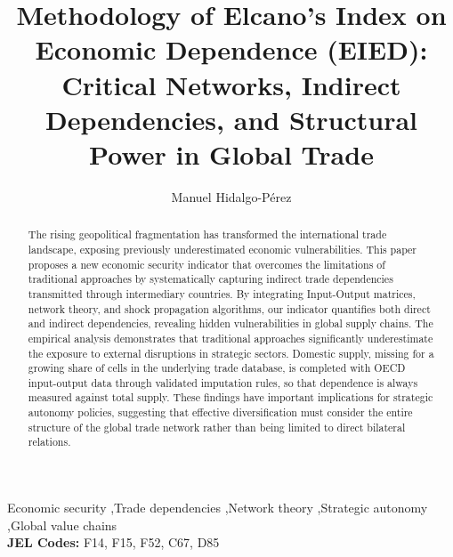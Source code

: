 \documentclass[final,1p,times,authoryear]{elsarticle}
\begin{document}
\begin{frontmatter}
\title{Methodology of Elcano's Index on Economic Dependence (EIED): Critical Networks, Indirect Dependencies, and Structural Power in Global Trade}

\author[upo,elcano]{Manuel Hidalgo-Pérez}



\begin{abstract}
The rising geopolitical fragmentation has transformed the international trade landscape, exposing previously underestimated economic vulnerabilities. This paper proposes a new economic security indicator that overcomes the limitations of traditional approaches by systematically capturing indirect trade dependencies transmitted through intermediary countries. By integrating Input-Output matrices, network theory, and shock propagation algorithms, our indicator quantifies both direct and indirect dependencies, revealing hidden vulnerabilities in global supply chains. The empirical analysis demonstrates that traditional approaches significantly underestimate the exposure to external disruptions in strategic sectors. Domestic supply, missing for a growing share of cells in the underlying trade database, is completed with OECD input-output data through validated imputation rules, so that dependence is always measured against total supply. These findings have important implications for strategic autonomy policies, suggesting that effective diversification must consider the entire structure of the global trade network rather than being limited to direct bilateral relations.
\end{abstract}

\begin{keyword}
Economic security \sep Trade dependencies \sep Network theory \sep Strategic autonomy \sep Global value chains\\
\textbf{JEL Codes:} F14, F15, F52, C67, D85
\end{keyword}
\end{frontmatter}
\end{document}
